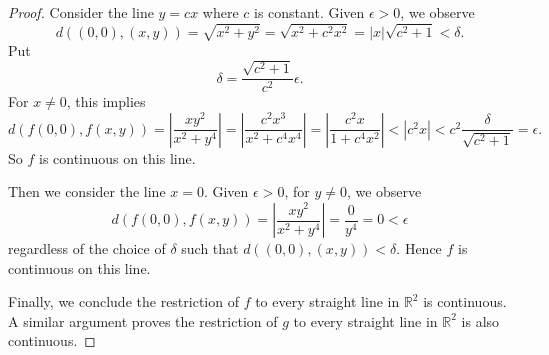 \begin{Exercise}
\begin{proof}
Consider the line $y = c x$ where $c$ is constant. Given $\epsilon>0$, we observe
$$
d((0,0), (x,y))
= \sqrt{x^2+y^2} 
= \sqrt{x^2 + c^2 x^2}
= |x| \sqrt{c^2+1}
< \delta.
$$
Put
$$
\delta = \frac{\sqrt{c^2+1}}{c^2}\epsilon.
$$
For $x\neq 0$, this implies
$$
d(f(0,0), f(x,y))
= \left| \frac{x y^2}{x^2+y^4} \right|
= \left| \frac{c^2 x^3}{x^2+c^4 x^4} \right|
= \left| \frac{c^2 x}{1+c^4 x^2} \right|
< |c^2 x|
< c^2 \frac{\delta}{\sqrt{c^2+1}}
= \epsilon.
$$
So $f$ is continuous on this line.

Then we consider the line $x=0$. Given $\epsilon>0$, for $y\neq 0$, we observe
$$
d(f(0,0),f(x,y))
= \left| \frac{x y^2}{x^2+y^4} \right|
= \frac{0}{y^4}
= 0
< \epsilon
$$
regardless of the choice of $\delta$ such that $d((0,0),(x,y))<\delta$. Hence $f$ is continuous on this line.

Finally, we conclude the restriction of $f$ to every straight line in $\mathbb{R}^2$ is continuous. A similar argument proves the restriction of $g$ to every straight line in $\mathbb{R}^2$ is also continuous.
\end{proof}
\end{Exercise}